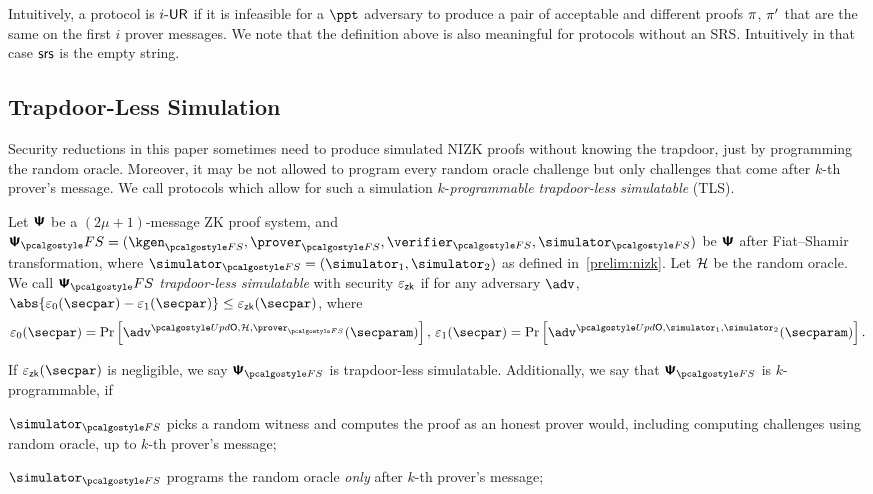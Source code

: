 Intuitively, a protocol is ${i\text{-}\mathsf{UR}}$ if it is infeasible for a $\ppt$ adversary to
produce a pair of acceptable and different proofs $\pi$, $\pi'$ that are
the same on the first $i$ prover messages.  We note that the definition above is also
meaningful for protocols without an SRS. Intuitively in that case $\mathsf{srs}$ is the empty
string.

 \subsection{Trapdoor-Less Simulation}
 Security reductions in this paper sometimes need to produce simulated NIZK proofs without
 knowing the trapdoor, just by programming the random oracle. Moreover, it may be not allowed to program every random oracle challenge but only challenges that come after $k$-th prover's message. We call protocols which allow for such a simulation $k$-\emph{programmable trapdoor-less simulatable} (TLS).

\begin{definition}
  \label{def:tls}
  Let $\bm{\mathsf{\Psi}}$ be a $(2\mu + 1)$-message ZK proof system, and
  $\ps_\fs= (\kgen_{\fs}, \prover_{\fs}, \verifier_{\fs}, \simulator_{\fs})$ be $\bm{\mathsf{\Psi}}$ after Fiat--Shamir transformation, where $\simulator_{\fs} = (\simulator_1, \simulator_2)$ as defined in~\cref{prelim:nizk}. Let $\mathcal{H}$ be the random oracle. 
  We call $\psfs$ \emph{trapdoor-less simulatable} with security $\varepsilon_{\mathsf{zk}}$ if for any
  adversary $\adv$, $\abs{\eps_0(\secpar) - \eps_1(\secpar)} \leq \epszk(\secpar)$, where
  \begin{align*}
    \eps_0 (\secpar) = \Pr\left[ \adv^{\initU, \ro, \prover_{\fs}} (\secparam) \right],\,
    \eps_1 (\secpar)=  \Pr \left[\adv^{\initU, \simulator_1, \simulator_2} (\secparam) \right].
  \end{align*}
  
  If $\epszk(\secpar)$ is negligible, we say $\ps_{\fs}$ is trapdoor-less simulatable. Additionally, we say that $\ps_{\fs}$ is $k$-programmable, if 
	\begin{inparaenum}[(a)]
		\item $\simulator_{\fs}$ picks a random witness and computes the proof as an honest prover would, including computing challenges using random oracle, up to $k$-th prover's message;
		\item $\simulator_{\fs}$  programs the random oracle \emph{only} after $k$-th prover's message;
	\end{inparaenum}
  \end{definition}

